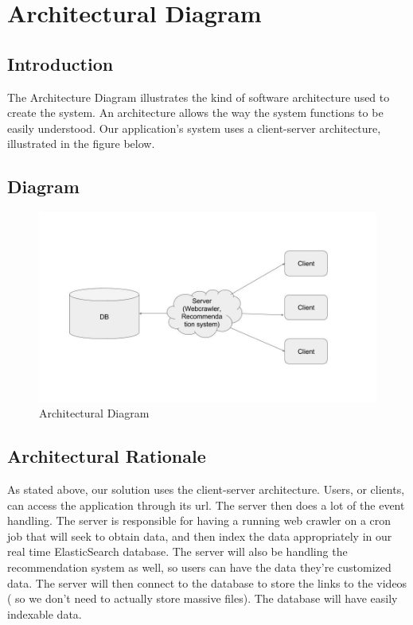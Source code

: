 \chapter{Architectural Diagram}
\section{Introduction}
	The Architecture Diagram illustrates the kind of software architecture used to create the system. An architecture allows the way the system functions to be easily understood. Our application’s system uses a client-server architecture, illustrated in the figure below.
\section{Diagram}
\begin{figure}[!ht]
      \centering
      \includegraphics[width=\textwidth]{architecturalDiagram}
      \caption{Architectural Diagram}	
\end{figure}
\section{Architectural Rationale}
	As stated above, our solution uses the client-server architecture. Users, or clients, can access the application through its url. The server then does a lot of the event handling. The server is responsible for having a running web crawler on a cron job that will seek to obtain data, and then index the data appropriately in our real time ElasticSearch database. The server will also be handling the recommendation system as well, so users can have the data they’re customized data. The server will then connect to the database to store the links to the videos ( so we don’t need to actually store massive files). The database will have easily indexable data. 